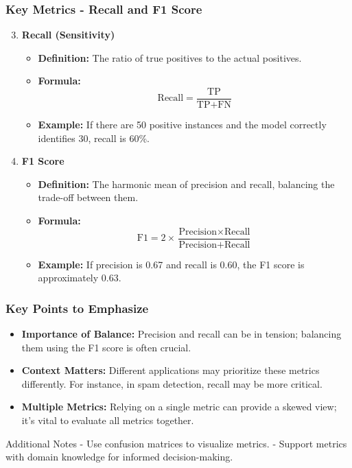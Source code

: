 \documentclass[aspectratio=169]{beamer}
\begin{document}
\begin{frame}[fragile]
  \frametitle{Key Metrics - Recall and F1 Score}
  \begin{enumerate}
    \setcounter{enumi}{2}
    \item \textbf{Recall (Sensitivity)}
      \begin{itemize}
        \item \textbf{Definition:} The ratio of true positives to the actual positives.
        \item \textbf{Formula:}
          \begin{equation}
          \text{Recall} = \frac{\text{TP}}{\text{TP} + \text{FN}}
          \end{equation}
        \item \textbf{Example:} If there are 50 positive instances and the model correctly identifies 30, recall is 60\%.
      \end{itemize}

    \item \textbf{F1 Score}
      \begin{itemize}
        \item \textbf{Definition:} The harmonic mean of precision and recall, balancing the trade-off between them.
        \item \textbf{Formula:}
          \begin{equation}
          \text{F1} = 2 \times \frac{\text{Precision} \times \text{Recall}}{\text{Precision} + \text{Recall}}
          \end{equation}
        \item \textbf{Example:} If precision is 0.67 and recall is 0.60, the F1 score is approximately 0.63.
      \end{itemize}
  \end{enumerate}
\end{frame}

\begin{frame}[fragile]
  \frametitle{Key Points to Emphasize}
  \begin{itemize}
    \item \textbf{Importance of Balance:} Precision and recall can be in tension; balancing them using the F1 score is often crucial.
    \item \textbf{Context Matters:} Different applications may prioritize these metrics differently. For instance, in spam detection, recall may be more critical.
    \item \textbf{Multiple Metrics:} Relying on a single metric can provide a skewed view; it's vital to evaluate all metrics together.
  \end{itemize}
  
  \begin{block}{Additional Notes}
    - Use confusion matrices to visualize metrics.
    - Support metrics with domain knowledge for informed decision-making.
  \end{block}
\end{frame}
\end{document}

